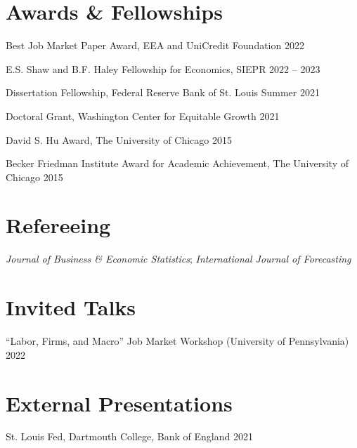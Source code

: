 \documentclass[margin,line]{res}                          %
\newenvironment{list1}{
	\begin{list}{\ding{113}}{%
			\setlength{\itemsep}{0in}
			\setlength{\parsep}{0in} \setlength{\parskip}{0in}
			\setlength{\topsep}{0in} \setlength{\partopsep}{0in}
			\setlength{\leftmargin}{0.17in}}}{\end{list}}
\begin{document}
\begin{resume}
	
	\section{\sc Awards \& Fellowships}
	\begin{list1}
		\item[] Best Job Market Paper Award, EEA and UniCredit Foundation
		 \hfill 2022\smallskip
		\item[] E.S. Shaw and B.F. Haley Fellowship for Economics, SIEPR \hfill 2022 -- 2023\smallskip
		\item[] Dissertation Fellowship, Federal Reserve Bank of St. Louis  \hfill Summer 2021\smallskip
		\item[] Doctoral Grant, Washington Center for Equitable Growth  \hfill 2021 \smallskip
		\item[] David S. Hu Award, The University of Chicago \hfill 2015\smallskip
		\item[] Becker Friedman Institute Award for Academic Achievement, The University of Chicago \hfill 2015\smallskip   
	\end{list1}
	
	\section{\sc Refereeing}
	\begin{list1}
		\item[] \emph{Journal of Business \& Economic Statistics}; \emph{International Journal of Forecasting} \smallskip
	\end{list1}
	
	\section{\sc Invited Talks}
	\begin{list1}
		\item[] ``Labor, Firms, and Macro'' Job Market Workshop (University of Pennsylvania)  \hfill 2022 \smallskip
	\end{list1}
	
	\section{\sc External Presentations}
	\begin{list1}
		\item[] St. Louis Fed, Dartmouth College, Bank of England  \hfill 2021 \smallskip
	\end{list1}
	

\end{resume}
\end{document}
